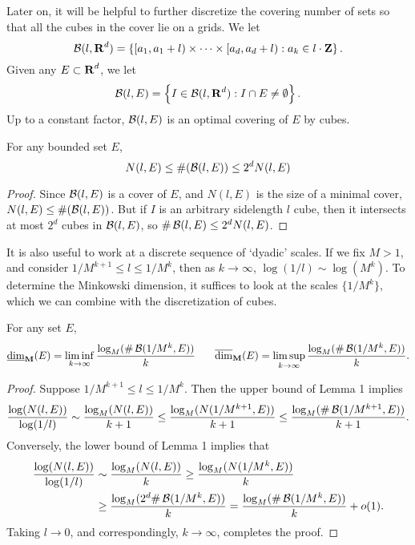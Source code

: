 Later on, it will be helpful to further discretize the covering number of sets so that all the cubes in the cover lie on a grids. We let
%
\[ \operatorname{\mathcal{B}}(l,\operatorname{\mathbf{R}}^d) = \left\{ [a_1,a_1 + l) \times \cdots \times [a_d,a_d + l): a_k \in l \cdot \operatorname{\mathbf{Z}} \right\}. \]
%
Given any $E \subset \operatorname{\mathbf{R}}^d$, we let
%
\[ \operatorname{\mathcal{B}}(l,E) = \left\{ I \in \operatorname{\mathcal{B}}(l,\operatorname{\mathbf{R}}^d): I \cap E \neq \emptyset \right\}. \]
%
Up to a constant factor, $\operatorname{\mathcal{B}}(l,E)$ is an optimal covering of $E$ by cubes.

\begin{lemma} \label{comparableCovers}
	For any bounded set $E$,
	\[ N(l,E) \leq \#(\operatorname{\mathcal{B}}(l,E)) \leq 2^d N(l,E) \]
\end{lemma}
\begin{proof}
	Since $\operatorname{\mathcal{B}}(l,E)$ is a cover of $E$, and $N(l,E)$ is the size of a minimal cover, $N(l,E) \leq \#(\operatorname{\mathcal{B}}(l,E))$. But if $I$ is an arbitrary sidelength $l$ cube, then it intersects at most $2^d$ cubes in $\operatorname{\mathcal{B}}(l,E)$, so $\# \operatorname{\mathcal{B}}(l,E) \leq 2^d N(l,E)$.
\end{proof}

It is also useful to work at a discrete sequence of `dyadic' scales. If we fix $M > 1$, and consider $1/M^{k+1} \leq l \leq 1/M^k$, then as $k \to \infty$, $\log(1/l) \sim \log(M^k)$. To determine the Minkowski dimension, it suffices to look at the scales $\{ 1/M^k \}$, which we can combine with the discretization of cubes.

\begin{corollary}
	For any set $E$,
	\[ \operatorname{\underline{\dim}_{\mathbf{M}}}(E) = \liminf_{k \to \infty} \frac{\log_M(\# \operatorname{\mathcal{B}}(1/M^k,E))}{k}\ \ \ \ \ \operatorname{\overline{\dim}_{\mathbf{M}}}(E) = \limsup_{k \to \infty} \frac{\log_M(\# \operatorname{\mathcal{B}}(1/M^k,E))}{k}. \]
\end{corollary}
\begin{proof}
	Suppose $1/M^{k+1} \leq l \leq 1/M^k$. Then the upper bound of Lemma 1 implies
	\[ \frac{\log(N(l,E))}{\log(1/l)} \sim \frac{\log_M(N(l,E))}{k+1} \leq \frac{\log_M(N(1/M^{k+1},E))}{k+1} \leq \frac{\log_M(\# \operatorname{\mathcal{B}}(1/M^{k+1},E))}{k+1}. \]
	Conversely, the lower bound of Lemma 1 implies that
	\begin{align*}
		\frac{\log(N(l,E))}{\log(1/l)} &\sim \frac{\log_M(N(l,E))}{k} \geq \frac{\log_M(N(1/M^k,E))}{k}\\
		&\geq \frac{\log_M(2^d \# \operatorname{\mathcal{B}}(1/M^k,E))}{k} = \frac{\log_M(\# \operatorname{\mathcal{B}}(1/M^k,E))}{k} + o(1).
	\end{align*}
	Taking $l \to 0$, and correspondingly, $k \to \infty$, completes the proof.
\end{proof}

